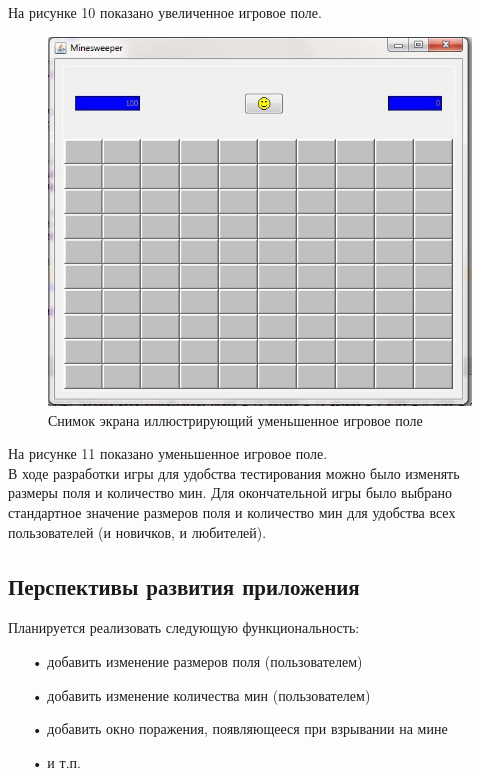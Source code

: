 На рисунке 10 показано увеличенное игровое поле. 

\begin{figure}[H]
	\begin{center}
		\includegraphics[scale=0.7]{images/9.jpg}
		\caption{Снимок экрана иллюстрирующий уменьшенное игровое поле} 
		\label{pic:pic_name} %
	\end{center}
\end{figure}

На рисунке 11 показано уменьшенное игровое поле.\\

В ходе разработки игры для удобства тестирования можно было изменять размеры поля и количество мин. Для окончательной игры было выбрано стандартное значение размеров поля и количество мин для удобства всех пользователей (и новичков, и любителей).

\subsection{Перспективы развития приложения}

Планируется реализовать следующую функциональность:
\begin{enumerate}
\item[•]  добавить изменение размеров поля (пользователем)
\item[•]  добавить изменение количества мин (пользователем)
\item[•]  добавить окно поражения, появляющееся при взрывании на мине
\item[•]  и т.п.
\end{enumerate}

